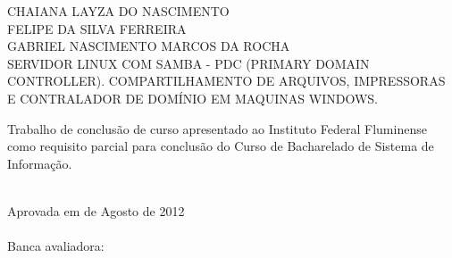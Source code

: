\begin{folhadeaprovacao}
    \setlength{\ABNTsignthickness}{0.4pt}
    \setlength{\ABNTsignwidth}{15cm}
    \setlength{\ABNTsignskip}{0.9cm}
    \begin{center}
	{\large CHAIANA LAYZA DO NASCIMENTO} \\
	{\large FELIPE DA SILVA FERREIRA} \\	
	{\large GABRIEL NASCIMENTO MARCOS DA ROCHA} \\ [4cm]
	{\large SERVIDOR LINUX COM SAMBA - PDC (PRIMARY DOMAIN CONTROLLER). COMPARTILHAMENTO DE ARQUIVOS, IMPRESSORAS E CONTRALADOR DE DOMÍNIO EM MAQUINAS WINDOWS.}\\ [2cm]
        \hspace{.45\textwidth} %
        \begin{minipage}{0.5\textwidth}
        \begin{espacosimples}
        Trabalho de conclusão de curso apresentado ao Instituto Federal Fluminense como requisito parcial para conclusão do Curso de Bacharelado de Sistema de Informação.\\\\
        \end{espacosimples}
        \end{minipage}
    \end{center}
    Aprovada em  de Agosto de 2012 \\\\
    Banca avaliadora:
\end{folhadeaprovacao}
